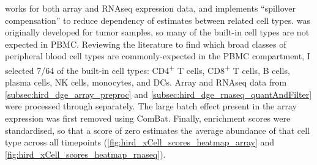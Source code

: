 works for both array and \gls{RNAseq} expression data,
and implements \enquote{spillover compensation} to reduce dependency of estimates between related cell types\autocite{aran2017XCellDigitallyPortraying}.
%
%
 was originally developed for tumor samples, so many of the built-in cell types are not expected in \gls{PBMC}.
Reviewing the literature to find which broad classes of peripheral blood cell types are commonly-expected in the \gls{PBMC} compartment\autocite{kleiveland2015PeripheralBloodMononuclear,vanderwijst2018SinglecellRNASequencing,davenport2018DiscoveringVivoCytokineeQTL},
I selected 7/64 of the built-in cell types: CD4\textsuperscript{+} T cells, CD8\textsuperscript{+} T cells, B cells, plasma cells, \gls{NK} cells, monocytes, and \glspl{DC}.
Array and \gls{RNAseq} data from \cref{subsec:hird_dge_array_preproc} and \cref{subsec:hird_dge_rnaseq_quantAndFilter} were processed through  separately.
The large batch effect present in the array expression was first removed using ComBat.
Finally, enrichment scores were standardised, so that a score of zero estimates the average abundance of that cell type across all timepoints (\cref{fig:hird_xCell_scores_heatmap_array} and \cref{fig:hird_xCell_scores_heatmap_rnaseq}).

